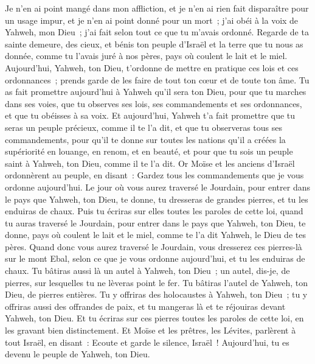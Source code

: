 \begin{multicols}{2}
Je n'en ai point mangé dans mon affliction, et je n'en ai rien fait disparaître pour un usage impur, et je n'en ai point donné pour un mort~; j'ai obéi à la voix de Yahweh, mon Dieu~; j'ai fait selon tout ce que tu m'avais ordonné.
Regarde de ta sainte demeure, des cieux, et bénis ton peuple d'Israël et la terre que tu nous as donnée, comme tu l'avais juré à nos pères, pays où coulent le lait et le miel.
Aujourd'hui, Yahweh, ton Dieu, t'ordonne de mettre en pratique ces lois et ces ordonnances~; prends garde de les faire de tout ton cœur et de toute ton âme.
Tu as fait promettre aujourd'hui à Yahweh qu'il sera ton Dieu, pour que tu marches dans ses voies, que tu observes ses lois, ses commandements et ses ordonnances, et que tu obéisses à sa voix.
Et aujourd'hui, Yahweh t'a fait promettre que tu seras un peuple précieux, comme il te l'a dit, et que tu observeras tous ses commandements,
pour qu'il te donne sur toutes les nations qu'il a créées la supériorité en louange, en renom, et en beauté, et pour que tu sois un peuple saint à Yahweh, ton Dieu, comme il te l'a dit.
\VerseOne{}Or Moïse et les anciens d'Israël ordonnèrent au peuple, en disant~: Gardez tous les commandements que je vous ordonne aujourd'hui.
Le jour où vous aurez traversé le Jourdain, pour entrer dans le pays que Yahweh, ton Dieu, te donne, tu dresseras de grandes pierres, et tu les enduiras de chaux.
Puis tu écriras sur elles toutes les paroles de cette loi, quand tu auras traversé le Jourdain, pour entrer dans le pays que Yahweh, ton Dieu, te donne, pays où coulent le lait et le miel, comme te l'a dit Yahweh, le Dieu de tes pères.
Quand donc vous aurez traversé le Jourdain, vous dresserez ces pierres-là sur le mont Ebal, selon ce que je vous ordonne aujourd'hui, et tu les enduiras de chaux.
Tu bâtiras aussi là un autel à Yahweh, ton Dieu~; un autel, dis-je, de pierres, sur lesquelles tu ne lèveras point le fer.
Tu bâtiras l'autel de Yahweh, ton Dieu, de pierres entières. Tu y offriras des holocaustes à Yahweh, ton Dieu~;
tu y offriras aussi des offrandes de paix, et tu mangeras là et te réjouiras devant Yahweh, ton Dieu.
Et tu écriras sur ces pierres toutes les paroles de cette loi, en les gravant bien distinctement.
Et Moïse et les prêtres, les Lévites, parlèrent à tout Israël, en disant~: Ecoute et garde le silence, Israël~! Aujourd'hui, tu es devenu le peuple de Yahweh, ton Dieu.

\end{multicols}
